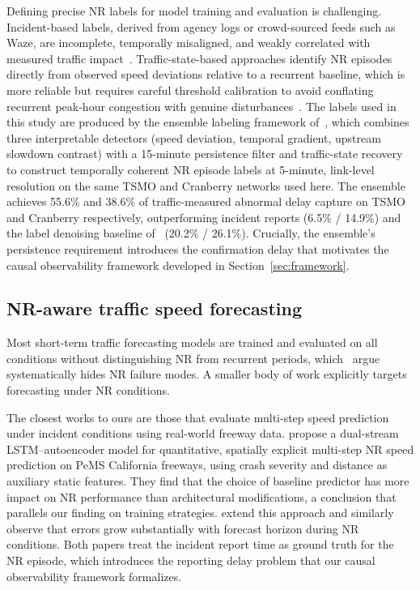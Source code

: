 \documentclass[a4paper]{cas-sc}
\begin{document}
Defining precise NR labels for model training and evaluation is
challenging.
Incident-based labels, derived from agency logs or crowd-sourced
feeds such as Waze, are incomplete, temporally misaligned, and weakly
correlated with measured traffic impact~\citep{duan2024, williams2007tmcsurvey}.
Traffic-state-based approaches identify NR episodes directly from
observed speed deviations relative to a recurrent baseline, which
is more reliable but requires careful threshold calibration to avoid
conflating recurrent peak-hour congestion with genuine
disturbances~\citep{chakraborty2019, chen2016nonrecurrent}.
The labels used in this study are produced by the ensemble labeling
framework of~\citet{bae2026labeling}, which combines three interpretable
detectors (speed deviation, temporal gradient, upstream slowdown contrast)
with a 15-minute persistence filter and traffic-state recovery to
construct temporally coherent NR episode labels at 5-minute, link-level
resolution on the same TSMO and Cranberry networks used here.
The ensemble achieves 55.6\% and 38.6\% of traffic-measured abnormal
delay capture on TSMO and Cranberry respectively, outperforming incident
reports (6.5\% / 14.9\%) and the label denoising baseline of~\citet{duan2024}
(20.2\% / 26.1\%).
Crucially, the ensemble's persistence requirement introduces the
confirmation delay that motivates the causal observability framework
developed in Section~\ref{sec:framework}.

\subsection{NR-aware traffic speed forecasting}

Most short-term traffic forecasting models are trained and evaluated
on all conditions without distinguishing NR from recurrent periods,
which~\citet{bae2026why} argue systematically hides NR failure modes.
A smaller body of work explicitly targets forecasting under NR conditions.

The closest works to ours are those that evaluate multi-step speed
prediction under incident conditions using real-world freeway data.
\citet{li2024freeway} propose a dual-stream LSTM--autoencoder model
for quantitative, spatially explicit multi-step NR speed prediction on
PeMS California freeways, using crash severity and distance as auxiliary
static features.
They find that the choice of baseline predictor has more impact on
NR performance than architectural modifications, a conclusion that
parallels our finding on training strategies.
\citet{li2025highway} extend this approach and similarly observe that
errors grow substantially with forecast horizon during NR conditions.
Both papers treat the incident report time as ground truth for the
NR episode, which introduces the reporting delay problem that our
causal observability framework formalizes.
\end{document}
